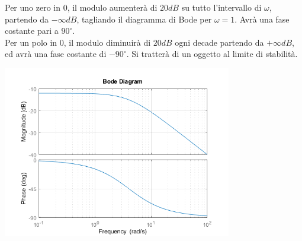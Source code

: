 \documentclass{article}
\numberwithin{equation}{subsection}
\begin{document}
\begin{center}
\end{center}

Per uno zero in $0$, il modulo aumenterà di $20dB$ su tutto l'intervallo di $\omega$, partendo da $-\infty dB$, tagliando il diagramma di Bode per $\omega=1$. 
Avrà una fase costante pari a $90^{\circ}$. \\
Per un polo in $0$, il modulo diminuirà di $20dB$ ogni decade partendo da $+\infty dB$, ed avrà una fase costante di $-90^{\circ}$. Si tratterà di un oggetto 
al limite di stabilità. 

\begin{center}
    \includegraphics[width=10cm]{Bode1Polo}
\end{center}
\end{document}

